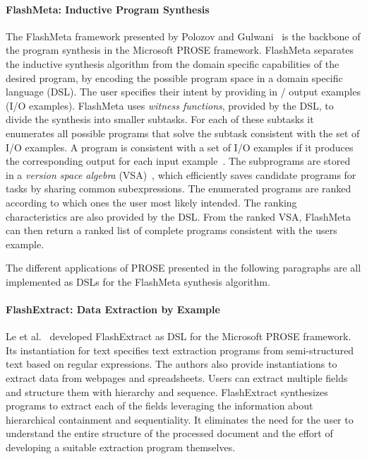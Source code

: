 \documentclass[\myrootdir/main.tex]{subfiles}
\begin{document}
\paragraph{FlashMeta: Inductive Program Synthesis}
The FlashMeta framework presented by Polozov and Gulwani~\cite{polozov2015flashmeta:} is the backbone of the program synthesis in the Microsoft PROSE framework.
FlashMeta separates the inductive synthesis algorithm from the domain specific capabilities of the desired program, by encoding the possible program space in a domain specific language (DSL).
The user specifies their intent by providing in / output examples (I/O examples).
FlashMeta uses \emph{witness functions}, provided by the DSL, to divide the synthesis into smaller subtasks.
For each of these subtasks it enumerates all possible programs that solve the subtask consistent with the set of I/O examples.
A program is consistent with a set of I/O examples if it produces the corresponding output for each input example~\cite{mitchell1982generalization}.
The subprograms are stored in a \emph{version space algebra} (VSA)~\cite{mitchell1982generalization}, which efficiently saves candidate programs for tasks by sharing common subexpressions.
The enumerated programs are ranked according to which ones the user most likely intended.
The ranking characteristics are also provided by the DSL.
From the ranked VSA, FlashMeta can then return a ranked list of complete programs consistent with the users example.

The different applications of PROSE presented in the following paragraphs are all implemented as DSLs for the FlashMeta synthesis algorithm.


\paragraph{FlashExtract: Data Extraction by Example}
Le et al.~\cite{le2014flashextract:} developed FlashExtract as DSL for the Microsoft PROSE framework.
Its instantiation for text specifies text extraction programs from semi-structured text based on regular expressions.
The authors also provide instantiations to extract data from webpages and spreadsheets.
Users can extract multiple fields and structure them with hierarchy and sequence.
FlashExtract synthesizes programs to extract each of the fields leveraging the information about hierarchical containment and sequentiality.
It eliminates the need for the user to understand the entire structure of the processed document and the effort of developing a suitable extraction program themselves.
\end{document}
